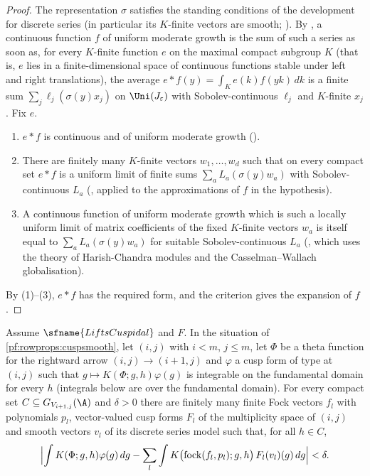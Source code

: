 \begin{proof}
The representation $\sigma$ satisfies the standing conditions of the development for discrete series (in particular its
$K$-finite vectors are smooth; ).
By , a continuous function $f$ of uniform moderate
growth is the sum of such a series as soon as, for every $K$-finite function $e$ on the maximal compact subgroup $K$ (that is,
$e$ lies in a finite-dimensional space of continuous functions stable under left and right translations), the average
$e*f(y)=\int_Ke(k)f(yk)\,dk$ is a finite sum $\sum_j\ell_j(\sigma(y)x_j)$ on $\Uni(J_\varepsilon)$ with Sobolev-continuous
$\ell_j$ and $K$-finite $x_j$. Fix $e$.
\begin{enumerate}[label=(\arabic*)]
\item $e*f$ is continuous and of uniform moderate growth
().
\item There are finitely many $K$-finite vectors $w_1,\dots,w_d$ such that on every compact set $e*f$ is a uniform limit of
finite sums $\sum_aL_a(\sigma(y)w_a)$ with Sobolev-continuous $L_a$
(, applied to the approximations of $f$ in the hypothesis).
\item A continuous function of uniform moderate growth which is such a locally uniform limit of matrix coefficients of the
fixed $K$-finite vectors $w_a$ is itself equal to $\sum_aL_a(\sigma(y)w_a)$ for suitable Sobolev-continuous $L_a$
(, which uses the theory of Harish-Chandra modules and
the Casselman--Wallach globalisation).
\end{enumerate}
By (1)--(3), $e*f$ has the required form, and the criterion gives the expansion of $f$.
\end{proof}

\begin{proposition}\label{pf:rowprops:approxfock}
Assume $\sfname{LiftsCuspidal}$ and $F$. In the situation of \cref{pf:rowprops:cuspsmooth}, let $(i,j)$ with $i<m$, $j\le m$, let
$\Phi$ be a theta function for the rightward arrow $(i,j)\to(i+1,j)$ and $\varphi$ a cusp form of type at $(i,j)$ such that
$g\mapsto K(\Phi;g,h)\varphi(g)$ is integrable on the fundamental domain for every $h$ (integrals below are over the
fundamental domain). For every compact set $C\subseteq G_{V_{i+1,j}}(\A)$ and $\delta>0$ there are finitely many finite Fock
vectors $f_l$ with polynomials $p_l$, vector-valued cusp forms $F_l$ of the multiplicity space of $(i,j)$ and smooth vectors
$v_l$ of its discrete series model such that, for all $h\in C$,
\[
\Bigl|\int K(\Phi;g,h)\varphi(g)\,dg-\sum_l\int K\bigl(\mathrm{fock}(f_l,p_l);g,h\bigr)\,F_l(v_l)(g)\,dg\Bigr|<\delta .
\]
\end{proposition}

